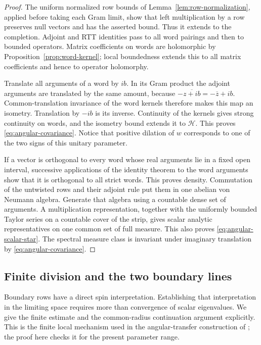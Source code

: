 \begin{proof}
The uniform normalized row bounds of Lemma~\ref{lem:row-normalization},
applied before taking each Gram limit, show that left multiplication by a
row preserves null vectors and has the asserted bound.  Thus it extends
to the completion.  Adjoint and RTT identities pass to all word pairings
and then to bounded operators.  Matrix coefficients on words are
holomorphic by Proposition~\ref{prop:word-kernel}; local boundedness
extends this to all matrix coefficients and hence to operator
holomorphy.

Translate all arguments of a word by $ib$.  In its Gram product the
adjoint arguments are translated by the same amount, because
$-\overline{z+ib}=-\overline z+ib$.  Common-translation invariance of the
word kernels therefore makes this map an isometry.  Translation by $-ib$
is its inverse.  Continuity of the kernels gives strong continuity on
words, and the isometry bound extends it to $\mathcal H$.  This proves
\eqref{eq:angular-covariance}.  Notice that positive dilation of $w$
corresponds to one of the two signs of this unitary parameter.

If a vector is orthogonal to every word whose real arguments lie in a
fixed open interval, successive applications of the identity theorem to
the word arguments show that it is orthogonal to all strict words.  This
proves density.  Commutation of the untwisted rows and their adjoint rule
put them in one abelian von Neumann algebra.  Generate that algebra using
a countable dense set of arguments.  A multiplication representation,
together with the uniformly bounded Taylor series on a countable cover
of the strip, gives scalar analytic representatives on one common set
of full measure.  This also proves
\eqref{eq:angular-scalar-star}.  The spectral measure class is invariant
under imaginary translation by \eqref{eq:angular-covariance}.
\end{proof}

\subsection{Finite division and the two boundary lines}

Boundary rows have a direct spin interpretation.  Establishing that
interpretation in the limiting space requires more than convergence of
scalar eigenvalues.  We give the finite estimate and the common-radius
continuation argument explicitly.  This is the finite local mechanism
used in the angular-transfer construction of
\cite[Section ``Angular transfer and its two leading modes'']{AngularRepository2026};
the proof here checks it for the present parameter range.

